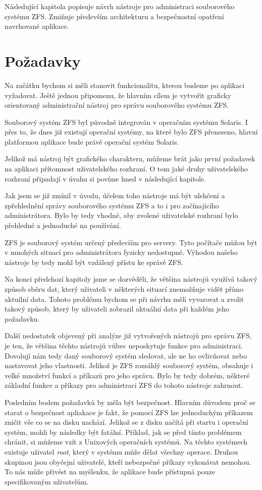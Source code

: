 Následující kapitola popisuje návrh nástroje pro administraci souborového systému ZFS. Zmiňuje především architekturu a bezpečnostní opatření navrhované aplikace.
\section{Požadavky}
Na začátku bychom si měli stanovit funkcionalitu, kterou budeme po aplikaci vyžadovat. Ještě jednou připomenu, že hlavním cílem je vytvořit graficky orientovaný administrační nástroj pro správu souborového systému ZFS.

Souborový systém ZFS byl původně integrován v operačním systému Solaris. I přes to, že dnes již existují operační systémy, na které bylo ZFS přeneseno, hlavní platformou aplikace bude právě operační systém Solaris.

Jelikož má nástroj být grafického charakteru, můžeme brát jako první požadavek na aplikaci přítomnost uživatelského rozhraní. O tom jaké druhy uživatelského rozhraní připadají v úvahu si povíme hned v následující kapitole.

Jak jsem se již zmínil v úvodu, účelem toho nástroje má být ulehčení a zpřehlednění správy souborového systému ZFS a to i pro začínajícího administrátora.  Bylo by tedy vhodné, aby zvolené uživatelské rozhraní bylo přehledné a jednoduché na používání.

ZFS je souborový systém určený především pro servery. Tyto počítače můžou být v mnohých situací pro administrátora fyzicky nedostupné. Výhodou našeho nástroje by tedy mohl být vzdálený přístu ke správě ZFS.

Na konci předchozí kapitoly jsme se dozvěděli, že většina nástrojů využívá takový způsob sběru dat, který uživateli v některých situací znemožňuje vidět přímo aktuílní data. Tohoto problému bychom se při návrhu měli vyvarovat a zvolit takový způsob, který by uživateli zobrazil aktuální data při každém jeho požadavku.

Další nedostatek objevený při analýze již vytvořených nástrojů pro správu ZFS, je ten, že většina těchto nástrojů vůbec neposkytuje funkce pro administraci. Dovolují nám tedy daný souborový systém sledovat, ale ne ho ovlivňovat nebo nastavovat jeho vlastnosti. Jelikož je ZFS rozsáhlý souborový systém, obsahuje i velké množství funkcí a příkazů pro jeho správu. Bylo by tedy dobrém, některé základní funkce a příkazy pro administraci ZFS do tohoto nástroje zahrnout.

Posledním bodem požadavků by měla být bezpečnost. Hlavním důvodem proč se starat o bezpečnost apliakace je fakt, že pomocí ZFS lze jednoduchým příkazem zničit vše co se na disku nachází. Jelikož se z disku načítá při startu i operační systém, mohli by následky být fatální. Příklad, jak se před tímto problémem chránit, si můžeme vzít z Unixových operačních systémů. Na těchto systémech existuje uživatel \emph{root}, který v systému může dělat všechny operace. Druhou skupinou jsou obyčejní uživatelé, kteří nebezpečné příkazy vykonávat nemohou. To nás může přivést na myšlenku, že aplikace bude přístupná pouze specifikovaným uživatelům.

